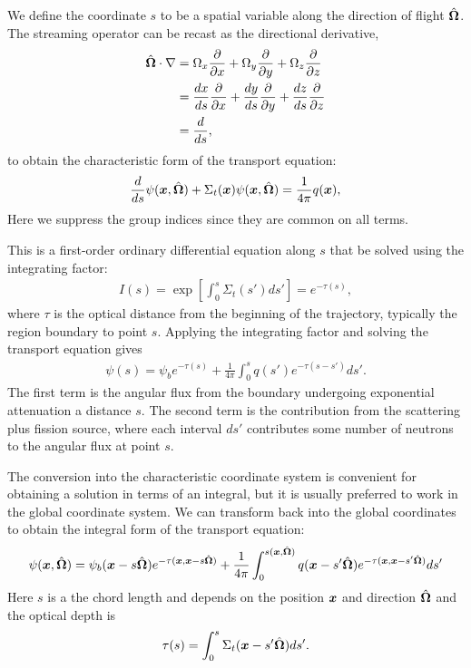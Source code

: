We define the coordinate $s$ to be a spatial variable along the direction of flight $\hat{\mathbf{\Omega}}$. The streaming operator can be recast as the directional derivative,
\begin{align}
  \hat{\mathbf{\Omega}} \cdot \nabla 
  &= \Omega_x \frac{ \partial {} }{ \partial {x} } + \Omega_y \frac{ \partial {} }{ \partial {y} } + \Omega_z \frac{ \partial {} }{ \partial {z} } \nonumber \\
  &= \frac{dx}{ds} \frac{ \partial {} }{ \partial {x} } + \frac{dy}{ds} \frac{ \partial {} }{ \partial {y} } + \frac{dz}{ds} \frac{ \partial {} }{ \partial {z} } \nonumber \\
  &= \frac{d}{ds} ,
\end{align}
to obtain the characteristic form of the transport equation:
\begin{align}
  \frac{d}{ds} \psi(\bm{x},\hat{\mathbf{\Omega}}) + \Sigma_t(\bm{x}) \psi(\bm{x},\hat{\mathbf{\Omega}}) = \frac{1}{4\pi} q(\bm{x}),
\end{align}
Here we suppress the group indices since they are common on all terms.

This is a first-order ordinary differential equation along $s$ that be solved using the integrating factor:
\begin{align}
  I(s) = \exp\left[ \int_0^s \Sigma_t(s') ds' \right] = e^{-\tau(s)},
\end{align}
where $\tau$ is the optical distance from the beginning of the trajectory, typically the region boundary to point $s$. Applying the integrating factor and solving the transport equation gives
\begin{align}
  \psi(s) = \psi_b e^{-\tau(s)} + \frac{1}{4\pi} \int_0^s q(s') e^{-\tau(s-s')} ds' .
\end{align}
The first term is the angular flux from the boundary undergoing exponential attenuation a distance $s$. The second term is the contribution from the scattering plus fission source, where each interval $ds'$ contributes some number of neutrons to the angular flux at point $s$.

The conversion into the characteristic coordinate system is convenient for obtaining a solution in terms of an integral, but it is usually preferred to work in the global coordinate system. We can transform back into the global coordinates to obtain the integral form of the transport equation:
\begin{align}
  \psi(\bm{x},\hat{\mathbf{\Omega}}) = \psi_b( \bm{x} - s\hat{\mathbf{\Omega}} ) e^{-\tau(\bm{x}, \bm{x} - s\hat{\mathbf{\Omega}} )} + \frac{1}{4\pi} \int_0^{s(\bm{x},\hat{\mathbf{\Omega}})} q(\bm{x} - s' \hat{\mathbf{\Omega}}) e^{-\tau(\bm{x}, \bm{x} - s'\hat{\mathbf{\Omega}} )} ds' \label{Eq:transport_integralFormAngularFlux}
\end{align}
Here $s$ is a the chord length and depends on the position $\bm{x}$ and direction $\hat{\mathbf{\Omega}}$ and the optical depth is
\begin{align}
  \tau(s) = \int_0^{s} \Sigma_t(\bm{x} - s'\hat{\mathbf{\Omega}}) ds' .
\end{align}

